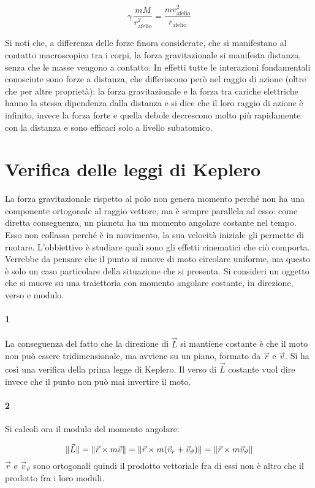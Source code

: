 \[
	\gamma\,\frac{mM}{r_\text{afelio}^2}=\frac{mv_\text{afelio}^2}{r_\text{afelio}}
\]

Si noti che, a differenza delle forze finora considerate, che si manifestano al contatto macroscopico tra i corpi, la forza gravitazionale si manifesta distanza, senza che le masse vengono a contatto. In effetti tutte le interazioni fondamentali conosciute sono forze a distanza, che differiscono però nel raggio di azione (oltre che per altre proprietà): la forza gravitazionale e la forza tra cariche elettriche hanno la stessa dipendenza dalla distanza e si dice che il loro raggio di azione è infinito, invece la forza forte e quella debole decrescono molto più rapidamente con la distanza e sono efficaci solo a livello subatomico.

\section{Verifica delle leggi di Keplero}

La forza gravitazionale rispetto al polo non genera momento perché non ha una componente ortogonale al raggio vettore, ma è sempre parallela ad esso: come diretta conseguenza, un pianeta ha un momento angolare costante nel tempo. Esso non collassa perché è in movimento, la sua velocità iniziale gli permette di ruotare. L'obbiettivo è studiare quali sono gli effetti cinematici che ciò comporta. Verrebbe da pensare che il punto si muove di moto circolare uniforme, ma questo è solo un caso particolare della situazione che si presenta.
Si consideri un oggetto che si muove su una traiettoria con momento angolare costante, in direzione, verso e modulo.

\paragraph{1} La conseguenza del fatto che la direzione di $\vec{L}$ si mantiene costante è che il moto non può essere tridimensionale, ma avviene su un piano, formato da $\vec{r}$ e $\vec{v}$. Si ha così una verifica della prima legge di Keplero. Il verso di $\vec{L}$ costante vuol dire invece che il punto non può mai invertire il moto.

\paragraph{2} Si calcoli ora il modulo del momento angolare:

\[
	\lVert\vec{L}\rVert=\lVert\vec{r}\times m\vec{v}\rVert=\lVert\vec{r}\times m(\vec{v}_r+\vec{v}_\vartheta)\rVert=\lVert\vec{r}\times m \vec{v}_\vartheta\rVert
\]
$\vec{r}$ e $\vec{v}_\vartheta$ sono ortogonali quindi il prodotto vettoriale fra di essi non è altro che il prodotto fra i loro moduli.

